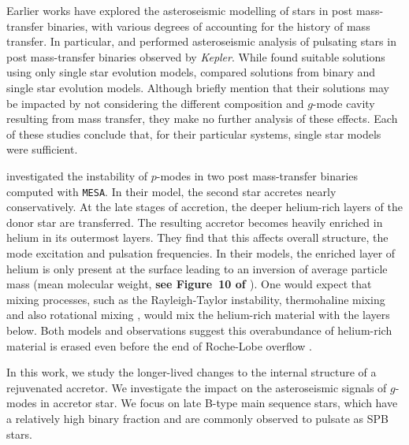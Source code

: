 \documentclass[desactivate]{aa}
\newcommand{\referee}[1]{{\bf #1}}
\begin{document}
Earlier works have explored the asteroseismic modelling of stars in post mass-transfer binaries, with various degrees of accounting for the history of mass transfer. In particular, \citet{Guo2017b, Guo+2017:2017ApJ...837..114G} and \citet{Chen2021} performed asteroseismic analysis of pulsating stars in post mass-transfer binaries observed by {\it Kepler}. While \citet{Guo2017b,Guo+2017:2017ApJ...837..114G} found suitable solutions using only single star evolution models, \citet{Chen2021} compared solutions from binary and single star evolution models. Although \citet{Guo+2017:2017ApJ...837..114G} briefly mention that their solutions may be impacted by not considering the different composition and $g$-mode cavity resulting from mass transfer, they make no further analysis of these effects. Each of these studies conclude that, for their particular systems, single star models were sufficient. 

\citet{Miszuda+2021,Miszuda+2022:2022MNRAS.514..622M} investigated the instability of $p$-modes in two post mass-transfer binaries computed with \texttt{MESA}. In their model, the second star accretes nearly conservatively. At the late stages of accretion, the deeper helium-rich layers of the donor star are transferred. The resulting accretor becomes heavily enriched in helium in its outermost layers. They find that this affects overall structure, the mode excitation and pulsation frequencies. In their models, the enriched layer of helium is only present at the surface leading to an inversion of average particle mass (mean molecular weight, \referee{see Figure~10 of \citealt{Miszuda+2021}}). One would expect that mixing processes, such as the Rayleigh-Taylor instability, thermohaline mixing and also rotational mixing \citep{Kippenhahn+1980, Cantiello+2007}, would mix the helium-rich material with the layers below. Both models and observations suggest this overabundance of helium-rich material is erased even before the end of Roche-Lobe overflow \citep{Renzo+2021}.

In this work, we study the longer-lived changes to the internal structure of a rejuvenated accretor.  We investigate the impact on the asteroseismic signals of $g$-modes in accretor star.  We focus on late B-type main sequence stars, which have a relatively high binary fraction and are commonly observed to pulsate as SPB stars. 
\end{document}
